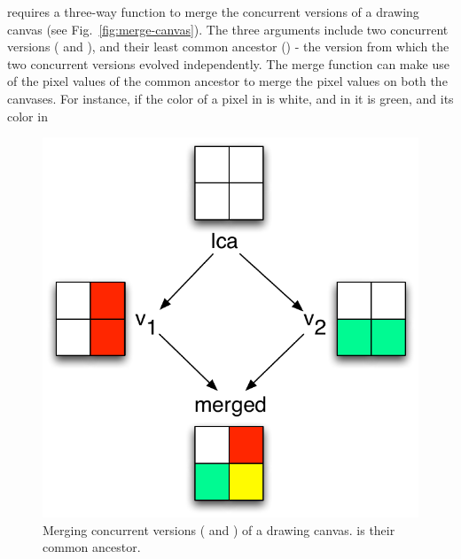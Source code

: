 
\name requires a three-way  function to merge the concurrent
versions of a drawing canvas (see Fig.~\ref{fig:merge-canvas}). The
three arguments include two concurrent versions ( and ),
and their least common ancestor () - the version from which the
two concurrent versions evolved independently. The merge function can
make use of the pixel values of the common ancestor to merge the pixel
values on both the canvases. For instance, if the color of a pixel in
 is white, and in  it is green, and its color in 
\begin{figure}
\centering
\includegraphics[scale=0.5]{Figures/canvas-merging}
\caption{Merging concurrent versions ( and  ) of a drawing
canvas.  is their common ancestor.}
\label{fig:canvas-merging}
\end{figure}
